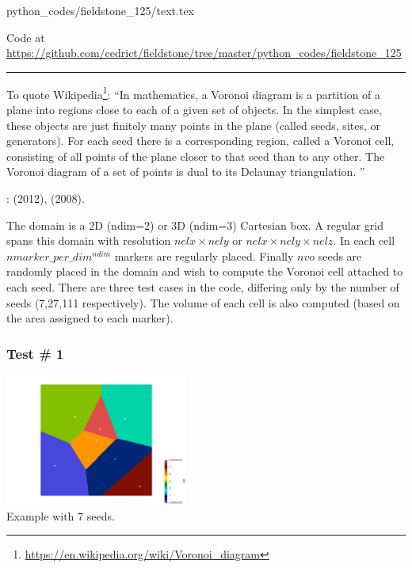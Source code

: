 \begin{flushright} {\tiny {\color{gray} python\_codes/fieldstone\_125/text.tex}} \end{flushright}

%

\begin{center}

Code at \url{https://github.com/cedrict/fieldstone/tree/master/python_codes/fieldstone_125}
\end{center}

\par\noindent\rule{\textwidth}{0.4pt}


To quote Wikipedia\footnote{\url{https://en.wikipedia.org/wiki/Voronoi_diagram}}:
``In mathematics, a Voronoi diagram is a partition of a plane into regions close to each of a given set of objects. 
In the simplest case, these objects are just finitely many points in the plane (called seeds, sites, or generators). 
For each seed there is a corresponding region, called a Voronoi cell, consisting of all points of the plane closer to 
that seed than to any other. The Voronoi diagram of a set of points is dual to its Delaunay triangulation. ''

\Literature: \textcite{may12} (2012), \textcite{hust08b} (2008).

The domain is a 2D ({\python ndim=2}) or 3D ({\python ndim=3}) 
Cartesian box. A regular grid spans this domain with resolution 
$nelx \times nely$ or $nelx \times nely \times nelz$. 
In each cell $nmarker\_per\_dim^{ndim}$ markers are regularly placed. 
Finally $nvo$ seeds are randomly placed in the domain and wish to compute the Voronoi cell attached to 
each seed. There are three test cases in the code, differing only by the number of seeds (7,27,111 respectively).
The volume of each cell is also computed (based on the area assigned to each marker).

\subsubsection*{Test \# 1}

\begin{center}
\includegraphics[width=6cm]{python_codes/fieldstone_125/results/diagram.png}\\
{\captionfont Example with 7 seeds.}
\end{center}


